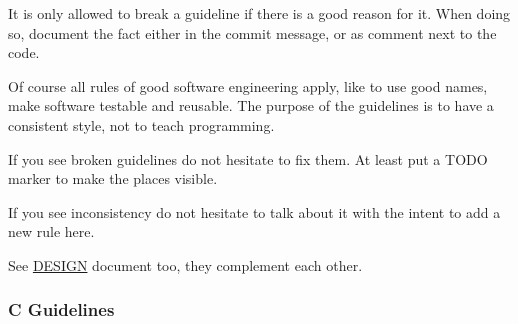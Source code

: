 It is only allowed to break a guideline if there is a good reason for it. When doing so, document the fact either in the commit message, or as comment next to the code.

Of course all rules of good software engineering apply, like to use good names, make software testable and reusable. The purpose of the guidelines is to have a consistent style, not to teach programming.

If you see broken guidelines do not hesitate to fix them. At least put a T\+O\+D\+O marker to make the places visible.

If you see inconsistency do not hesitate to talk about it with the intent to add a new rule here.

See \hyperlink{doc_DESIGN_md}{D\+E\+S\+I\+G\+N} document too, they complement each other.

\subsubsection*{C Guidelines}


